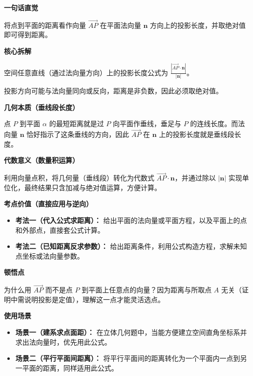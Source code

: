 \begin{explanationbox}
	\textbf{\textcolor{CExplanation}{一句话直觉}}

	将点到平面的距离看作向量 $\vec{AP}$ 在平面法向量 $\mathbf{n}$ 方向上的投影长度，并取绝对值即可得到距离。

	\medskip
	\textbf{\textcolor{CExplanation}{核心拆解}}
	\begin{description}[style=nextline, leftmargin=2.8em, labelsep=0.5em, itemsep=0.45em]
		\item[\textbf{要点一（向量投影原理）：}] 空间任意直线（通过法向量方向）上的投影长度公式为 $\frac{|\vec{AP}\cdot\mathbf{n}|}{|\mathbf{n}|}$。
		\item[\textbf{要点二（绝对值必要性）：}] 投影方向可能与法向量同向或反向，距离是非负数，因此必须取绝对值。
	\end{description}

	\medskip
	\textbf{\textcolor{CExplanation}{几何本质（垂线段长度）}}

	点 $P$ 到平面 $\alpha$ 的最短距离就是过 $P$ 向平面作垂线，垂足与 $P$ 的连线长度。而法向量 $\mathbf{n}$ 恰好指示了这条垂线的方向，因此 $\vec{AP}$ 在 $\mathbf{n}$ 上的投影长度就是垂线段长度。

	\medskip
	\textbf{\textcolor{CExplanation}{代数意义（数量积运算）}}

	利用向量点积，将几何量（垂线段）转化为代数式 $\vec{AP}\cdot\mathbf{n}$，并通过除以 $|\mathbf{n}|$ 实现单位化，最终结果只含加减与绝对值运算，方便计算。

	\medskip
	\textbf{\textcolor{CExplanation}{考点价值（直接应用与逆向）}}
	\begin{itemize}[leftmargin=*, itemsep=0.5em, topsep=0.4em]
		\item \textbf{考法一（代入公式求距离）：} 给出平面的法向量或平面方程，以及平面上的点和外部点，直接套公式计算。
		\item \textbf{考法二（已知距离反求参数）：} 给出距离条件，利用公式构造方程，求解未知点坐标或法向量参数。
	\end{itemize}

	\medskip
	\textbf{\textcolor{CExplanation}{顿悟点}}

	为什么用 $\vec{AP}$ 而不是点 $P$ 到平面上任意点的向量？因为距离与所取点 $A$ 无关（证明中需说明投影是定值），理解这一点才能灵活选点。

	\medskip
	\textbf{\textcolor{CExplanation}{使用场景}}
	\begin{itemize}[leftmargin=*, itemsep=0.5em, topsep=0.4em]
		\item \textbf{场景一（建系求点面距）：} 在立体几何题中，当能方便建立空间直角坐标系并求出法向量时，优先用此公式。
		\item \textbf{场景二（平行平面间距离）：} 将平行平面间的距离转化为一个平面内一点到另一平面的距离，同样适用此公式。
	\end{itemize}
\end{explanationbox}
